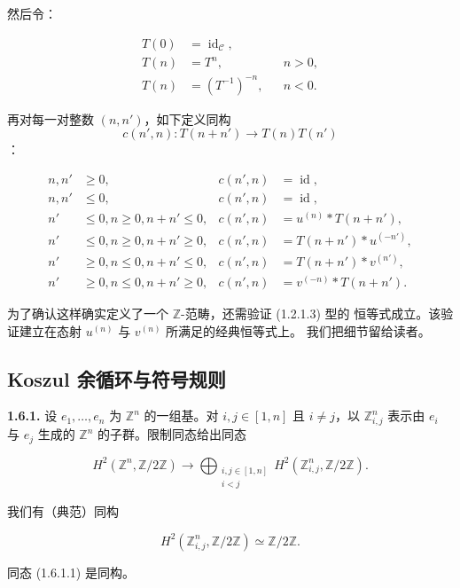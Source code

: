\clearpage
{}%
然后令：

\begin{equation}
  \begin{aligned}
    T(0)&=\operatorname{id}_{\mathcal C},\\
    T(n)&=T^n, && n>0,\\
    T(n)&=(T^{-1})^{-n}, && n<0.
  \end{aligned}
  \tag{1.5.14.3}
\end{equation}

再对每一对整数 $(n,n')$，如下定义同构
\[
  c(n',n)\colon T(n+n')\longrightarrow T(n)T(n')
\]
：

\begin{equation}
  \begin{aligned}
    n,n'&\geq 0,
      &c(n',n)&=\operatorname{id},\\
    n,n'&\leq 0,
      &c(n',n)&=\operatorname{id},\\
    n'&\leq 0, n\geq 0, n+n'\leq 0,
      &c(n',n)&=u^{(n)}\mathbin{*}T(n+n'),\\
    n'&\leq 0, n\geq 0, n+n'\geq 0,
      &c(n',n)&=T(n+n')\mathbin{*}u^{(-n')},\\
    n'&\geq 0, n\leq 0, n+n'\leq 0,
      &c(n',n)&=T(n+n')\mathbin{*}v^{(n')},\\
    n'&\geq 0, n\leq 0, n+n'\geq 0,
      &c(n',n)&=v^{(-n)}\mathbin{*}T(n+n').
  \end{aligned}
  \tag{1.5.14.4}
\end{equation}

为了确认这样确实定义了一个 $\mathbb Z$-范畴，还需验证 (1.2.1.3) 型的
恒等式成立。该验证建立在态射 $u^{(n)}$ 与 $v^{(n)}$ 所满足的经典恒等式上。
我们把细节留给读者。

\subsection{Koszul 余循环与符号规则}

\noindent\textbf{1.6.1.}\quad
设 $e_1,\ldots,e_n$ 为 $\mathbb Z^n$ 的一组基。对
$i,j\in[1,n]$ 且 $i\neq j$，以 $\mathbb Z^n_{i,j}$ 表示由 $e_i$ 与
$e_j$ 生成的 $\mathbb Z^n$ 的子群。限制同态给出同态

\begin{equation}
  H^2(\mathbb Z^n,\mathbb Z/2\mathbb Z)
  \longrightarrow
  \bigoplus_{\substack{i,j\in[1,n]\\ i<j}}
    H^2(\mathbb Z^n_{i,j},\mathbb Z/2\mathbb Z).
  \tag{1.6.1.1}
\end{equation}

我们有（典范）同构

\begin{equation}
  H^2(\mathbb Z^n_{i,j},\mathbb Z/2\mathbb Z)
  \simeq \mathbb Z/2\mathbb Z.
  \tag{1.6.1.2}
\end{equation}

同态 (1.6.1.1) 是同构。
